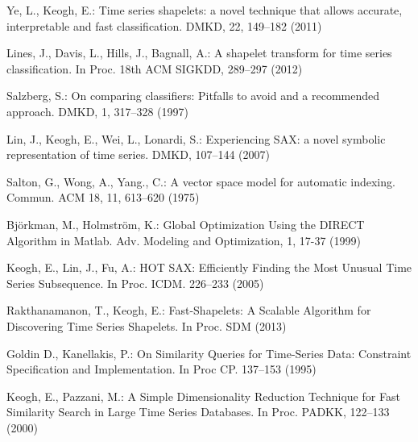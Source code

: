 \documentclass[conference]{IEEEtran}
\begin{document}
\begin{thebibliography}{5}


Ye, L., Keogh, E.:
Time series shapelets: a novel technique that allows accurate, interpretable and fast
classification. 
DMKD, 22, 149--182 (2011)


Lines, J., Davis, L., Hills, J., Bagnall, A.:
A shapelet transform for time series classification. 
In Proc. 18th ACM SIGKDD, 289--297 (2012)


Salzberg, S.:
On comparing classifiers: Pitfalls to avoid and a recommended approach. 
DMKD, 1, 317--328 (1997)

Lin, J., Keogh, E., Wei, L., Lonardi, S.:
Experiencing SAX: a novel symbolic representation of time series.
DMKD, 107--144 (2007)

Salton, G., Wong, A., Yang., C.:
A vector space model for automatic indexing. 
Commun. ACM 18, 11, 613--620 (1975)

Bj\"{o}rkman, M., Holmstr\"{o}m, K.:
Global Optimization Using the DIRECT Algorithm in Matlab.
Adv. Modeling and Optimization, 1, 17-37 (1999)

Keogh, E., Lin, J., Fu, A.:
HOT SAX: Efficiently Finding the Most Unusual Time Series Subsequence. 
In Proc. ICDM. 226--233 (2005)

Rakthanamanon, T., Keogh, E.:
Fast-Shapelets: A Scalable Algorithm for Discovering Time Series Shapelets.
In Proc. SDM (2013)

Goldin D., Kanellakis, P.:
On Similarity Queries for Time-Series Data: Constraint Specification and Implementation. 
In Proc CP. 137--153 (1995)

Keogh, E., Pazzani, M.:
A Simple Dimensionality Reduction Technique for Fast Similarity Search in Large Time Series
Databases. In Proc. PADKK, 122--133 (2000)



\end{thebibliography}
\end{document}
